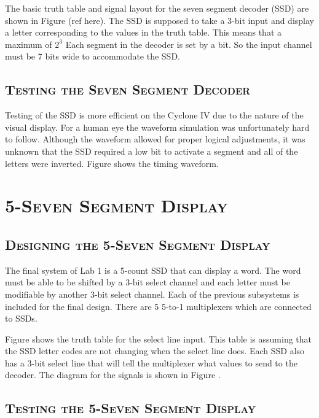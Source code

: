 \documentclass[11pt]{report}
\begin{document}
\begin{spacing}{1.5}
The basic truth table and signal layout for the seven segment decoder (SSD) are shown in Figure (ref here).  The SSD is supposed to take a 3-bit input and display a letter corresponding to the values in the truth table.  This means that a maximum of $2^3$  Each segment in the decoder is set by a bit.  So the input channel must be 7 bits wide to accommodate the SSD.

\subsection{\scshape Testing the Seven Segment Decoder} %
\label{sub:test_ssd}

Testing of the SSD is more efficient on the Cyclone IV due to the nature of the visual display.  For a human eye the waveform simulation was unfortunately hard to follow.  Although the waveform allowed for proper logical adjustments, it was unknown that the SSD required a low bit to activate a segment and all of the letters were inverted.  Figure shows the timing waveform.

\section{\scshape 5-Seven Segment Display}
\label{sec:5_ssd}

\subsection{\scshape Designing the 5-Seven Segment Display} %
\label{sub:design_5_ssd}

The final system of Lab 1 is a 5-count SSD that can display a word.  The word must be able to be shifted by a 3-bit select channel and each letter must be modifiable by another 3-bit select channel.  Each of the previous subsystems is included for the final design.  There are 5 5-to-1 multiplexers which are connected to SSDs.   

Figure shows the truth table for the select line input.  This table is assuming that the SSD letter codes are not changing when the select line does.  Each SSD also has a 3-bit select line that will tell the multiplexer what values to send to the decoder.  The diagram for the signals is shown in Figure .

\subsection{\scshape Testing the 5-Seven Segment Display}
\label{sub:test_5_ssd}


\end{spacing}
\end{document}
